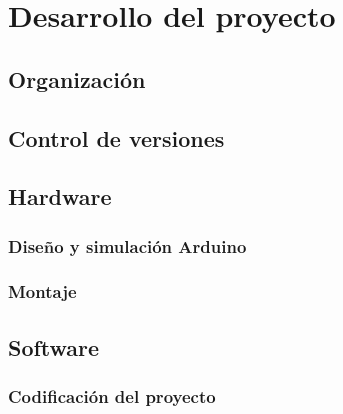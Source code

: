 \chapter{Desarrollo del proyecto}

\section{Organización}

\section{Control de versiones}

\section{Hardware}
\subsection{Diseño y simulación Arduino}
\subsection{Montaje}

\section{Software}
\subsection{Codificación del proyecto}
